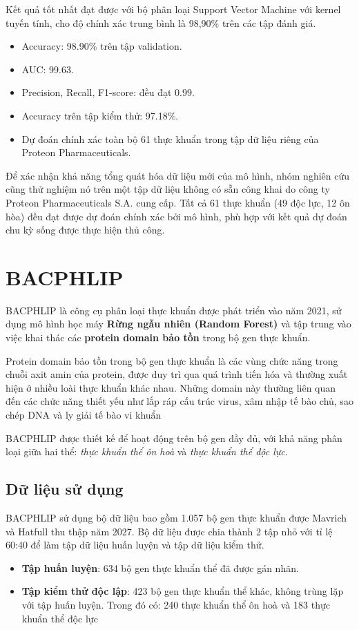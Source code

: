 Kết quả tốt nhất đạt được với bộ phân loại Support Vector Machine với kernel tuyến tính, cho độ chính xác trung bình là 98,90\% trên các tập đánh giá.
    \begin{itemize}
        \item Accuracy: 98.90\% trên tập validation.
        \item AUC: 99.63.
        \item Precision, Recall, F1-score: đều đạt 0.99.
        \item Accuracy trên tập kiểm thử: 97.18\%.
        \item Dự đoán chính xác toàn bộ 61 thực khuẩn trong tập dữ liệu riêng của Proteon Pharmaceuticals.
    \end{itemize}

Để xác nhận khả năng tổng quát hóa dữ liệu mới của mô hình, nhóm nghiên cứu cũng thử nghiệm nó trên một tập dữ liệu không có sẵn công khai do công ty Proteon Pharmaceuticals S.A. cung cấp. Tất cả 61 thực khuẩn (49 độc lực, 12 ôn hòa) đều đạt được dự đoán chính xác bởi mô hình, phù hợp với kết quả dự đoán chu kỳ sống được thực hiện thủ công.

\section{BACPHLIP}

BACPHLIP \cite{hockenberry2021bacphlip} là công cụ phân loại thực khuẩn được phát triển vào năm 2021, sử dụng mô hình học máy \textbf{Rừng ngẫu nhiên (Random Forest)} và tập trung vào việc khai thác các \textbf{protein domain bảo tồn} trong bộ gen thực khuẩn. 

Protein domain bảo tồn trong bộ gen thực khuẩn là các vùng chức năng trong chuỗi axit amin của protein, được duy trì qua quá trình tiến hóa và thường xuất hiện ở nhiều loài thực khuẩn khác nhau. Những domain này thường liên quan đến các chức năng thiết yếu như lắp ráp cấu trúc virus, xâm nhập tế bào chủ, sao chép DNA và ly giải tế bào vi khuẩn

BACPHLIP được thiết kế để hoạt động trên bộ gen đầy đủ, với khả năng phân loại giữa hai thể: \textit{thực khuẩn thể ôn hoà} và \textit{thực khuẩn thể độc lực}.

\subsection*{Dữ liệu sử dụng}
BACPHLIP sử dụng bộ dữ liệu bao gồm 1.057 bộ gen thực khuẩn được Mavrich và Hatfull thu thập năm 2027. Bộ dữ liệu được chia thành 2 tập nhỏ với tỉ lệ 60:40 để làm tập dữ liệu huấn luyện và tập dữ liệu kiểm thử. 
\begin{itemize}
    \item \textbf{Tập huấn luyện}: 634 bộ gen thực khuẩn thể đã được gán nhãn.
    \item \textbf{Tập kiểm thử độc lập}: 423 bộ gen thực khuẩn thể khác, không trùng lặp với tập huấn luyện. Trong đó có: 240 thực khuẩn thể ôn hoà và 183 thực khuẩn thể độc lực
\end{itemize}

